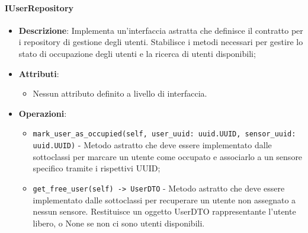 \documentclass[10pt]{article}
\begin{document}
    \paragraph{IUserRepository}
    \begin{itemize} 
    \item \textbf{Descrizione}: Implementa un'interfaccia astratta che definisce il contratto per i repository di gestione degli utenti. Stabilisce i metodi necessari per gestire lo stato di occupazione degli utenti e la ricerca di utenti disponibili;
    \item \textbf{Attributi}:
    \begin{itemize}
        \item Nessun attributo definito a livello di interfaccia.
    \end{itemize}
    
    \item \textbf{Operazioni}:
    \begin{itemize}
        \item \texttt{mark\_user\_as\_occupied(self, user\_uuid: uuid.UUID, sensor\_uuid: uuid.UUID)} - Metodo astratto che deve essere implementato dalle sottoclassi per marcare un utente come occupato e associarlo a un sensore specifico tramite i rispettivi UUID;
        
        \item \texttt{get\_free\_user(self) -> UserDTO} - Metodo astratto che deve essere implementato dalle sottoclassi per recuperare un utente non assegnato a nessun sensore. Restituisce un oggetto UserDTO rappresentante l'utente libero, o None se non ci sono utenti disponibili.
    \end{itemize}
    \end{itemize}
\end{document}

